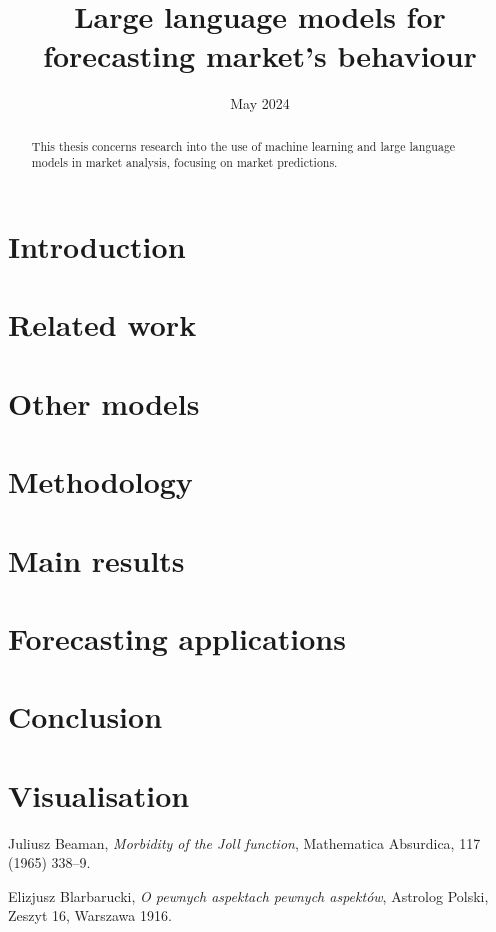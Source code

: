 \documentclass[en]{pracamgr}
\title{Large language models for forecasting market's behaviour}
\date{May 2024}
\begin{document}
\newcommand{\rozdzial}[2]{
	\chapter{#1}
	
}

\maketitle

\begin{abstract}
        This thesis concerns research into the use of machine learning 
        and large language models in market analysis, focusing on market
        predictions.

\end{abstract}

\tableofcontents

\rozdzial{Introduction}{introduction}
\rozdzial{Related work}{related-work}
\rozdzial{Other models}{other-models}
\rozdzial{Methodology }{methodology}
\rozdzial{Main results}{results}
\rozdzial{Forecasting applications}{forecasting-application}
\rozdzial{Conclusion}{conclusion}
\appendix
\rozdzial{Visualisation}{visualisation}
\begin{thebibliography}{99}

	 Juliusz Beaman, \textit{Morbidity of the Joll function}, Mathematica Absurdica, 117 (1965) 338--9.

	 Elizjusz Blarbarucki, \textit{O pewnych
		aspektach pewnych aspektów}, Astrolog Polski, Zeszyt 16, Warszawa
	1916.

\end{thebibliography}
\end{document}
